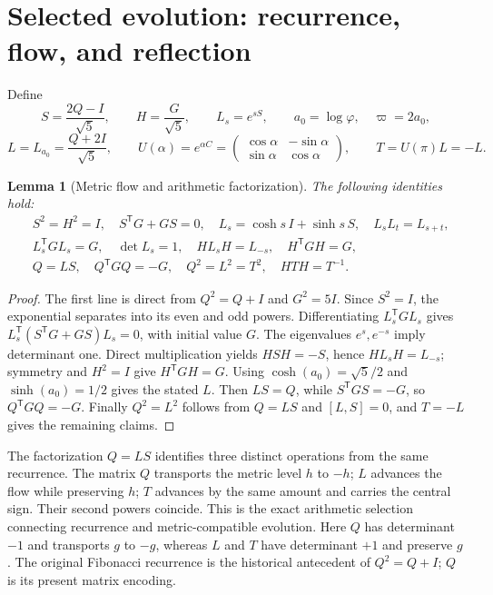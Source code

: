 \documentclass[10pt,letterpaper]{article}
\newtheorem{lemma}[theorem]{Lemma}
\theoremstyle{definition}\newtheorem{definition}[theorem]{Definition}
\newcommand{\Id}{I}
\newcommand{\ph}{\varphi}
\newcommand{\varp}{\varpi}
\begin{document}
\section{Selected evolution: recurrence, flow, and reflection}
Define
\begin{equation}\label{eq:ops}
 S=\frac{2Q-\Id}{\sqrt5},\qquad H=\frac{G}{\sqrt5},\qquad
 L_s=e^{sS},\qquad a_0=\log\ph,\quad \varp=2a_0,
\end{equation}
\begin{equation}\label{eq:step}
 L=L_{a_0}=\frac{Q+2\Id}{\sqrt5},\qquad
 U(\alpha)=e^{\alpha C}=\begin{pmatrix}\cos\alpha&-\sin\alpha\\\sin\alpha&\cos\alpha\end{pmatrix},\qquad
 T=U(\pi)L=-L.
\end{equation}

\begin{lemma}[Metric flow and arithmetic factorization]\label{lem:arithmetic}
The following identities hold:
\begin{align}\label{eq:arithmetic}
&S^2=H^2=\Id,\quad S^{\mathsf T}G+GS=0,\quad
 L_s=\cosh s\,\Id+\sinh s\,S,\quad L_sL_t=L_{s+t},\\
&L_s^{\mathsf T}GL_s=G,\quad \det L_s=1,\quad H L_sH=L_{-s},
   \quad H^{\mathsf T}GH=G,\\
&Q=LS,\quad Q^{\mathsf T}GQ=-G,\quad
 Q^2=L^2=T^2,\quad HTH=T^{-1}.\nonumber
\end{align}
\end{lemma}
\begin{proof}
The first line is direct from $Q^2=Q+\Id$ and $G^2=5\Id$. Since $S^2=\Id$, the exponential separates into its even and odd powers. Differentiating $L_s^{\mathsf T}GL_s$ gives $L_s^{\mathsf T}(S^{\mathsf T}G+GS)L_s=0$, with initial value $G$. The eigenvalues $e^s,e^{-s}$ imply determinant one. Direct multiplication yields $HSH=-S$, hence $HL_sH=L_{-s}$; symmetry and $H^2=\Id$ give $H^{\mathsf T}GH=G$. Using $\cosh(a_0)=\sqrt5/2$ and $\sinh(a_0)=1/2$ gives the stated $L$. Then $LS=Q$, while $S^{\mathsf T}GS=-G$, so $Q^{\mathsf T}GQ=-G$. Finally $Q^2=L^2$ follows from $Q=LS$ and $[L,S]=0$, and $T=-L$ gives the remaining claims.
\end{proof}

The factorization $Q=LS$ identifies three distinct operations from the same recurrence. The matrix $Q$ transports the metric level $h$ to $-h$; $L$ advances the flow while preserving $h$; $T$ advances by the same amount and carries the central sign. Their second powers coincide. This is the exact arithmetic selection connecting recurrence and metric-compatible evolution. Here $Q$ has determinant $-1$ and transports $g$ to $-g$, whereas $L$ and $T$ have determinant $+1$ and preserve $g$. The original Fibonacci recurrence is the historical antecedent of $Q^2=Q+I$; $Q$ is its present matrix encoding.
\end{document}
